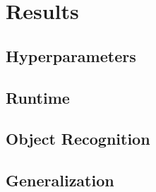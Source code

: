 \chapter{Results}\label{chapter:results}
\section{Hyperparameters}
\section{Runtime}
\section{Object Recognition}
\section{Generalization}